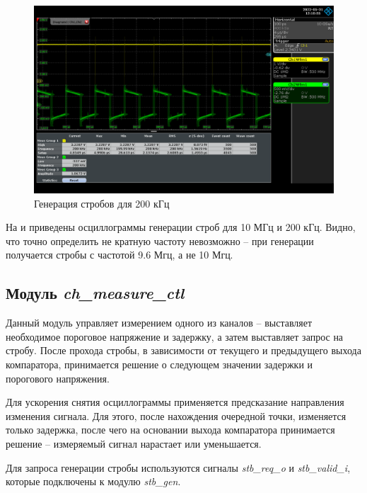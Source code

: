 \begin{figure}[ht!] 
	\center
	\includegraphics  [scale=0.3] {my_folder/images//stb_200khz}
	\caption{Генерация стробов для 200 кГц} 
	\label{fig:stb-200khz}  
\end{figure}

\FloatBarrier

На  и  приведены осциллограммы генерации строб для 10 МГц и 200 кГц.
Видно, что точно определить не кратную частоту невозможно -- при генерации получается стробы с частотой 9.6 Мгц, а не 10 Мгц.

\subsection{Модуль \emph{ch\_measure\_ctl}}

Данный модуль управляет измерением одного из каналов -- выставляет необходимое пороговое напряжение и задержку, а
затем выставляет запрос на стробу. После прохода стробы, в зависимости от текущего и предыдущего выхода компаратора, принимается решение
о следующем значении задержки и порогового напряжения.

Для ускорения снятия осциллограммы применяется предсказание направления изменения сигнала. Для этого, после нахождения очередной точки,
изменяется только задержка, после чего на основании выхода компаратора принимается решение -- измеряемый сигнал нарастает или уменьшается.

Для запроса генерации стробы используются сигналы \emph{stb\_req\_o} и \emph{stb\_valid\_i}, которые подключены к модулю \emph{stb\_gen}.

